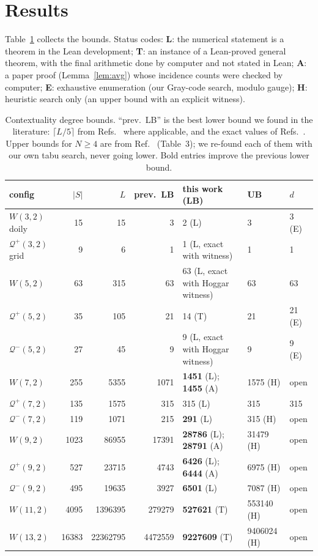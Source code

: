 \documentclass[aps,pra,onecolumn,11pt,superscriptaddress,nofootinbib]{revtex4-2}
\theoremstyle{definition}
\theoremstyle{remark}
\newcommand{\Qp}{\mathcal{Q}^{+}}
\newcommand{\Qm}{\mathcal{Q}^{-}}
\begin{document}
\section{Results}

Table~\ref{tab:results} collects the bounds. Status codes:
\textbf{L}: the numerical statement is a theorem in the Lean development;
\textbf{T}: an instance of a Lean-proved general theorem, with the final arithmetic
done by computer and not stated in Lean;
\textbf{A}: a paper proof (Lemma~\ref{lem:avg}) whose incidence counts were checked by
computer;
\textbf{E}: exhaustive enumeration (our Gray-code search, modulo gauge);
\textbf{H}: heuristic search only (an upper bound with an explicit witness).

\begin{table}[t]
\caption{Contextuality degree bounds. ``prev.\ LB'' is the best lower bound we found in the
literature: $\lceil L/5\rceil$ from Refs.~\cite{Muller2025heur,LGG2026} where applicable, and
the exact values of Refs.~\cite{deBoutray2022,Muller2024,LGG2026}. Upper bounds for $N\ge4$ are
from Ref.~\cite{Muller2025heur} (Table~3); we re-found each of them with our own tabu search,
never going lower. Bold entries improve the previous lower bound.}
\label{tab:results}
\begin{ruledtabular}
\begin{tabular}{lrrrlll}
config & $|S|$ & $L$ & prev.\ LB & this work (LB) & UB & $d$ \\
\midrule
$W(3,2)$ doily & 15 & 15 & 3 & 2 (L) & 3 & 3 (E) \\
$\Qp(3,2)$ grid & 9 & 6 & 1 & 1 (L, exact with witness) & 1 & 1 \\
$W(5,2)$ & 63 & 315 & 63 & 63 (L, exact with Hoggar witness) & 63 & 63 \\
$\Qp(5,2)$ & 35 & 105 & 21 & 14 (T) & 21 & 21 (E) \\
$\Qm(5,2)$ & 27 & 45 & 9 & 9 (L, exact with Hoggar witness) & 9 & 9 (E) \\
$W(7,2)$ & 255 & 5355 & 1071 & \textbf{1451} (L); \textbf{1455} (A) & 1575 (H) & open \\
$\Qp(7,2)$ & 135 & 1575 & 315 & 315 (L) & 315 & 315~\cite{LGG2026} \\
$\Qm(7,2)$ & 119 & 1071 & 215 & \textbf{291} (L) & 315 (H) & open \\
$W(9,2)$ & 1023 & 86955 & 17391 & \textbf{28786} (L); \textbf{28791} (A) & 31479 (H) & open \\
$\Qp(9,2)$ & 527 & 23715 & 4743 & \textbf{6426} (L); \textbf{6444} (A) & 6975 (H) & open \\
$\Qm(9,2)$ & 495 & 19635 & 3927 & \textbf{6501} (L) & 7087 (H) & open \\
$W(11,2)$ & 4095 & 1396395 & 279279 & \textbf{527621} (T) & 553140 (H) & open \\
$W(13,2)$ & 16383 & 22362795 & 4472559 & \textbf{9227609} (T) & 9406024 (H) & open \\
\end{tabular}
\end{ruledtabular}
\end{table}
\end{document}
